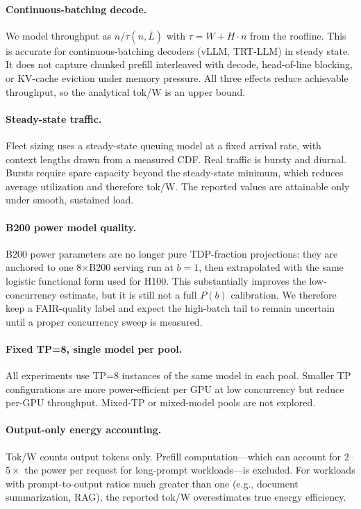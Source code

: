\documentclass[11pt,a4paper]{article}
\begin{document}
\paragraph{Continuous-batching decode.}
We model throughput as $n / \tau(n, \bar{L})$ with $\tau = W + H \cdot n$
from the roofline.  This is accurate for continuous-batching decoders (vLLM,
TRT-LLM) in steady state.  It does not capture chunked prefill interleaved
with decode, head-of-line blocking, or KV-cache eviction under memory pressure.
All three effects reduce achievable throughput, so the analytical tok/W is an
upper bound.

\paragraph{Steady-state traffic.}
Fleet sizing uses a steady-state queuing model at a fixed arrival rate, with
context lengths drawn from a measured CDF.  Real traffic is bursty and
diurnal.  Bursts require spare capacity beyond the steady-state minimum, which
reduces average utilization and therefore tok/W.  The reported values are
attainable only under smooth, sustained load.

\paragraph{B200 power model quality.}
B200 power parameters are no longer pure TDP-fraction projections: they are
anchored to one 8$\times$B200 serving run at $b{=}1$, then extrapolated with
the same logistic functional form used for H100.  This substantially improves
the low-concurrency estimate, but it is still not a full $P(b)$ calibration.
We therefore keep a FAIR-quality label and expect the high-batch tail to remain
uncertain until a proper concurrency sweep is measured.

\paragraph{Fixed TP=8, single model per pool.}
All experiments use TP=8 instances of the same model in each pool.  Smaller
TP configurations are more power-efficient per GPU at low concurrency but
reduce per-GPU throughput.  Mixed-TP or mixed-model pools are not explored.

\paragraph{Output-only energy accounting.}
Tok/W counts output tokens only.  Prefill computation---which can account for
$2$--$5\times$ the power per request for long-prompt workloads---is excluded.
For workloads with prompt-to-output ratios much greater than one (e.g.,
document summarization, RAG), the reported tok/W overestimates true energy
efficiency.
\end{document}
